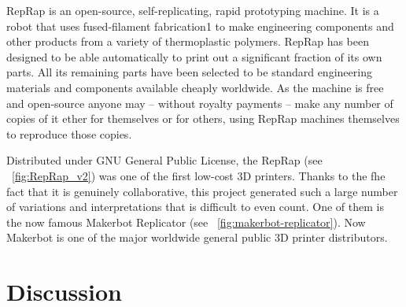 \begin{formal}
    RepRap is an open-source, self-replicating, rapid prototyping machine. It is a robot that uses fused-filament fabrication1 to make engineering components and other products from a variety of thermoplastic polymers. RepRap has been designed to be able automatically to print out a significant fraction of its own parts. All its remaining parts have been selected to be standard engineering materials and components available cheaply worldwide. As the machine is free and open-source anyone may – without royalty payments – make any number of copies of it ether for themselves or for others, using RepRap machines themselves to reproduce those copies.

\end{formal}


\begin{figure}[tb]
\centering
    \hfil
    \caption{}
    \label{fig:RepRap_project}
\end{figure}


Distributed under GNU General Public License, the RepRap (see \figurename~\ref{fig:RepRap_v2}) was one of the first low-cost 3D printers. Thanks to the fhe fact that it is genuinely collaborative, this project generated such a large number of variations and interpretations that is difficult to even count. One of them is the now famous Makerbot Replicator (see \figurename~\ref{fig:makerbot-replicator}). Now Makerbot is one of the major worldwide general public 3D printer distributors.



\section{Discussion}







